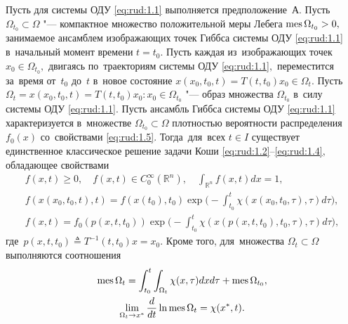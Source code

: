 \begin{theorem} Пусть для системы ОДУ \eqref{eq:rud:1.1} выполняется {предположение~А.}
Пусть $\Omega_{t_0}\subset\Omega$ "--- компактное множество положительной меры Лебега \linebreak  $\mathop{\rm mes}\Omega_{t_0}>0,$ занимаемое ансамблем изображающих точек Гиббса системы ОДУ \eqref{eq:rud:1.1} в~начальный момент времени $t=t_0.$ Пусть каждая из~изображающих точек $x_0\in\Omega_{t_0},$ двигаясь по~траекториям системы ОДУ \eqref{eq:rud:1.1}$,$ переместится за~время от~$t_0$ до~$t$ в~новое состояние $x(x_0,t_0,t)=T(t,t_0)x_0\in\Omega_t.$ 
Пусть $\Omega_t={x(x_0,t_0,t)=T(t,t_0)x_0: x_0\in\Omega_{t_0}}$ "--- образ множества $\Omega_{t_0}$ в~силу системы ОДУ
\eqref{eq:rud:1.1}$.$ 
Пусть ансамбль Гиббса системы ОДУ \eqref{eq:rud:1.1} характеризуется в~множестве $\Omega_{t_0}\subset\Omega$ плотностью вероятности распределения $f_0(x)$ со~свойствами \eqref{eq:rud:1.5}.
Тогда~для~всех $t\in I$ существует единственное классическое решение задачи Коши \eqref{eq:rud:1.2}--\eqref{eq:rud:1.4}$,$ обладающее свойствами 
\begin{gather}
f(x,t)\ge 0, \quad  f(x,t)\in C_0^{\infty}{(\mathbb R^n)}, \quad  \int_{\mathbb R^n}f(x,t)dx=1,
\label{eq:rud:1.6}
\\
 f(x(x_0,t_0,t),t)=f(x(t_0),t_0) \exp{\biggl( -\int_{t_0}^{t}\chi(x(x_0,t_0,\tau),\tau)d\tau\biggr)},\label{eq:rud:1.7}
\\
 f(x,t)=f_0(p(x,t,t_0))\exp{\biggl( -\int_{t_0}^{t}\chi(x(p(x,t,t_0),t_0,\tau),\tau)d\tau\biggr)},\label{eq:rud:1.8}
\end{gather}
где~$p(x,t,t_0)\triangleq T^{-1}(t,t_0)x=x_0.$ Кроме того, для~множества $\Omega_t\subset\Omega$ выполняются соотношения
\begin{gather}
\mathop{\rm mes}\Omega_t=\int_{t_0}^{t}\int_{\Omega_t}\chi(x,\tau)dxd\tau+\mathop{\rm mes}\Omega_{t_0},\label{eq:rud:1.9}
\\
\lim\limits_{\Omega_t\to x^*}\frac{d}{dt}\ln \mathop{\rm mes}\Omega_t=\chi(x^*,t).\label{eq:rud:1.10}
\end{gather}
\end{theorem}

\smallskip

